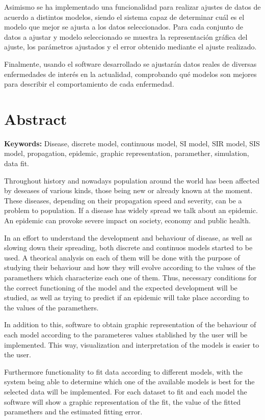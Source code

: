 Asimismo se ha implementado una funcionalidad para realizar ajustes de datos de acuerdo a distintos modelos, siendo el sistema capaz de determinar cuál es el modelo que mejor se ajusta a los datos seleccionados. Para cada conjunto de datos a ajustar y modelo seleccionado se muestra la representación gráfica del ajuste, los parámetros ajustados y el error obtenido mediante el ajuste realizado.

Finalmente, usando el software desarrollado se ajustarán datos reales de diversas enfermedades de interés en la actualidad, comprobando qué modelos son mejores para describir el comportamiento de cada enfermedad.



\chapter*{Abstract}

\textbf{Keywords: } Disease, discrete model, continuous model, SI model, SIR model, SIS model, propagation, epidemic, graphic representation, paramether, simulation, data fit.

Throughout history and nowadays population around the world has been affected by deseases of various kinds, those being new or already known at the moment. These diseases, depending on their propagation speed and severity, can be a problem to population. If a disease has widely spread we talk about an epidemic. An epidemic can provoke severe impact on society, economy and public health.

In an effort to understand the development and behaviour of disease, as well as slowing down their spreading, both discrete and continuos models started to be used. A theorical analysis on each of them will be done with the purpose of studying their behaviour and how they will evolve according to the values of the paramethers which characterize each one of them. Thus, necessary conditions for the correct functioning of the model and the expected development will be studied, as well as trying to predict if an epidemic will take place according to the values of the paramethers.

In addition to this, software  to obtain graphic representation of the behaviour of each model according to the parameteres values stablished by the user will be implemented. This way, visualization and interpretation of the models is easier to the user.

Furthermore functionality to fit data according to different models, with the system being able to determine which one of the available models is best for the selected data will be implemented. For each dataset to fit and each model the software will show a graphic representation of the fit, the value of the fitted paramethers and the estimated fitting error.

